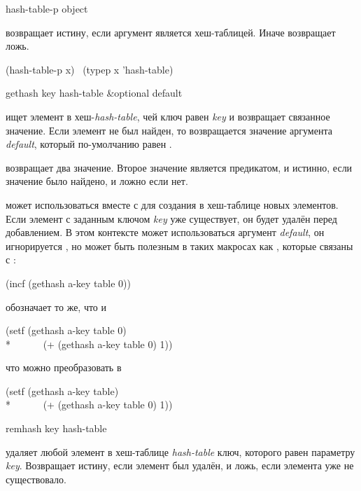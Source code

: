 \begin{defun}[Function]
hash-table-p object

 возвращает истину, если аргумент является хеш-таблицей. Иначе
возвращает ложь.
\begin{lisp}
(hash-table-p x) \EQ\ (typep x 'hash-table)
\end{lisp}
\end{defun}

\begin{defun}[Function]
gethash key hash-table &optional default

 ищет элемент в хеш-\emph{hash-table}, чей ключ равен \emph{key} и
возвращает связанное значение. Если элемент не был найден, то возвращается
значение аргумента \emph{default}, который по-умолчанию равен {\false}.

 возвращает два значение. Второе значение является предикатом, и
истинно, если значение было найдено, и ложно если нет.

 может использоваться вместе с  для создания в
хеш-таблице новых элементов. Если элемент с заданным ключом \emph{key} уже
существует, он будет удалён перед добавлением. В этом контексте может
использоваться аргумент \emph{default}, он игнорируется , но может
быть полезным в таких макросах как , которые связаны с :
\begin{lisp}
(incf (gethash a-key table 0))
\end{lisp}
обозначает то же, что и 
\begin{lisp}
(setf (gethash a-key table 0) \\*
~~~~~~(+ (gethash a-key table 0) 1))
\end{lisp}
что можно преобразовать в
\begin{lisp}
(setf (gethash a-key table) \\*
~~~~~~(+ (gethash a-key table 0) 1))
\end{lisp}
\end{defun}

\begin{defun}[Function]
remhash key hash-table

 удаляет любой элемент в хеш-таблице \emph{hash-table} ключ,
которого равен параметру \emph{key}. Возвращает истину, если элемент был
удалён, и ложь, если элемента уже не существовало.
\end{defun}

